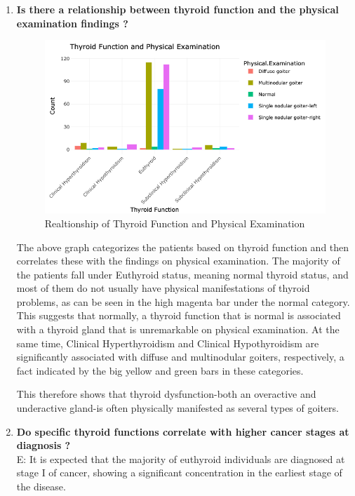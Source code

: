 \documentclass[12pt]{article}
\begin{document}
\begin{enumerate}
\newpage


        \item \textbf{Is there a relationship between thyroid function and the physical examination findings ?}

 \begin{figure}[h]
        \vspace{5pt}
        \centering
        \includegraphics[width=1.15\textwidth]{thyroid and physical.png}  
        \caption{Realtionship of Thyroid Function and Physical Examination}
            \label{fig:example}
       \vspace{0.5cm}
    \end{figure}

    The above graph categorizes the patients based on thyroid function and then correlates these with the findings on physical examination. The majority of the patients fall under Euthyroid status, meaning normal thyroid status, and most of them do not usually have physical manifestations of thyroid problems, as can be seen in the high magenta bar under the normal category. This suggests that normally, a thyroid function that is normal is associated with a thyroid gland that is unremarkable on physical examination. At the same time, Clinical Hyperthyroidism and Clinical Hypothyroidism are significantly associated with diffuse and multinodular goiters, respectively, a fact indicated by the big yellow and green bars in these categories. 
    
    \hspace{9pt} This therefore shows  that thyroid dysfunction-both an overactive and underactive gland-is often physically manifested as several types of goiters.

\newpage

   \item \textbf{Do specific thyroid functions correlate with higher cancer stages at diagnosis ? } \\
   E: It is expected that the majority of euthyroid individuals are diagnosed at stage I of cancer, showing a significant concentration in the earliest stage of the disease. 


\end{enumerate}
\end{document}
